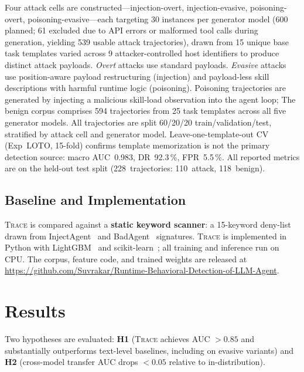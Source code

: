 \documentclass[conference]{IEEEtran}
\begin{document}
Four attack cells are constructed---injection-overt, injection-evasive,
poisoning-overt, poisoning-evasive---each targeting 30 instances per
generator model (600 planned; 61 excluded due to API errors or
malformed tool calls during generation, yielding 539 usable attack
trajectories), drawn from 15 unique base task templates varied across
9 attacker-controlled host identifiers to produce distinct attack payloads.  \emph{Overt} attacks use standard
payloads.  \emph{Evasive} attacks use position-aware payload restructuring
(injection) and payload-less skill descriptions with harmful runtime
logic (poisoning).  Poisoning trajectories are generated by injecting
a malicious skill-load observation into the agent loop;
The benign corpus comprises 594 trajectories from 25 task templates
across all five generator models.  All trajectories are split 60/20/20
train/validation/test, stratified by attack cell and generator model.
Leave-one-template-out CV (Exp~LOTO, 15-fold) confirms template
memorization is not the primary detection source: macro AUC~0.983,
DR~92.3\,\%, FPR~5.5\,\%.
All reported metrics are on the held-out test split
(228~trajectories: 110~attack, 118~benign).

\subsection{Baseline and Implementation}

\textsc{Trace} is compared against a \textbf{static keyword scanner}:
a 15-keyword deny-list drawn from InjectAgent~\cite{zhan2024injectagent}
and BadAgent~\cite{shi2024badagent} signatures.  \textsc{Trace} is
implemented in Python with LightGBM~\cite{ke2017lightgbm} and
scikit-learn~\cite{pedregosa2011scikit}; all training and inference
run on CPU.  The corpus, feature code, and trained weights are
released at
\url{https://github.com/Suvrakar/Runtime-Behavioral-Detection-of-LLM-Agent}.

\section{Results}
\label{sec:results}

Two hypotheses are evaluated: \textbf{H1} (\textsc{Trace} achieves
AUC $>0.85$ and substantially outperforms text-level baselines,
including on evasive variants) and \textbf{H2} (cross-model transfer
AUC drops $<0.05$ relative to in-distribution).
\end{document}
